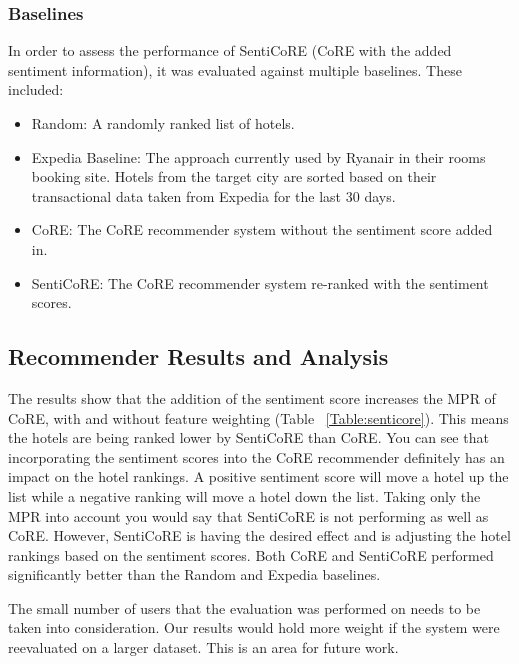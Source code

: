 \subsubsection{Baselines}
In order to assess the performance of SentiCoRE (CoRE with the added sentiment information), it was evaluated against multiple baselines. These included: 
\begin{itemize}
    \item Random: A randomly ranked list of hotels.
    \item Expedia Baseline: The approach currently used by Ryanair in their rooms booking site. Hotels from the target city are sorted based on their transactional data taken from Expedia for the last 30 days.
    \item CoRE: The CoRE recommender system without the sentiment score added in.
    \item SentiCoRE: The CoRE recommender system re-ranked with the sentiment scores.
\end{itemize}

\subsection{Recommender Results and Analysis}

The results show that the addition of the sentiment score increases the MPR of CoRE, with and without feature weighting (Table ~\ref{Table:senticore}). This means the hotels are being ranked lower by SentiCoRE than CoRE. You can see that incorporating the sentiment scores into the CoRE recommender definitely has an impact on the hotel rankings. A positive sentiment score will move a hotel up the list while a negative ranking will move a hotel down the list. Taking only the MPR into account you would say that SentiCoRE is not performing as well as CoRE. However, SentiCoRE is having the desired effect and is adjusting the hotel rankings based on the sentiment scores. Both CoRE and SentiCoRE performed significantly better than the Random and Expedia baselines.

\begin{table}[h!]
\caption{Recommender Systems Performance.}
\label{Table:senticore}
\end{table}

The small number of users that the evaluation was performed on needs to be taken into consideration. Our results would hold more weight if the system were reevaluated on a larger dataset. This is an area for future work.
